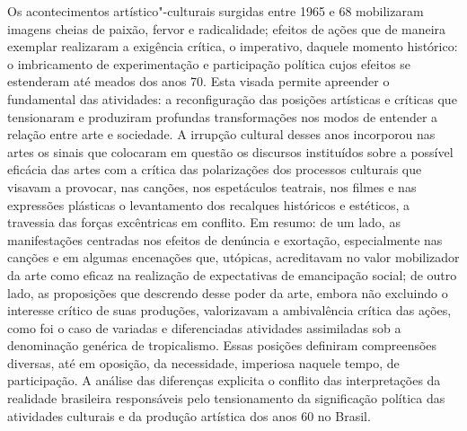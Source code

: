 Os acontecimentos artístico"-culturais surgidas entre 1965 e 68
mobilizaram imagens cheias de paixão, fervor e radicalidade; efeitos de
ações que de maneira exemplar realizaram a exigência crítica, o
imperativo, daquele momento histórico: o imbricamento de experimentação
e participação política cujos efeitos se estenderam até meados dos anos
70. Esta visada permite apreender o fundamental das atividades: a
reconfiguração das posições artísticas e críticas que tensionaram e
produziram profundas transformações nos modos de entender a relação
entre arte e sociedade. A irrupção cultural desses anos incorporou nas
artes os sinais que colocaram em questão os discursos instituídos sobre
a possível eficácia das artes com a crítica das polarizações dos
processos culturais que visavam a provocar, nas canções, nos espetáculos
teatrais, nos filmes e nas expressões plásticas o levantamento dos
recalques históricos e estéticos, a travessia das forças excêntricas em
conflito. Em resumo: de um lado, as manifestações centradas nos efeitos
de denúncia e exortação, especialmente nas canções e em algumas
encenações que, utópicas, acreditavam no valor mobilizador da arte como
eficaz na realização de expectativas de emancipação social; de outro
lado, as proposições que descrendo desse poder da arte, embora não
excluindo o interesse crítico de suas produções, valorizavam a
ambivalência crítica das ações, como foi o caso de variadas e
diferenciadas atividades assimiladas sob a denominação genérica de
tropicalismo. Essas posições definiram compreensões diversas, até em
oposição, da necessidade, imperiosa naquele tempo, de participação. A
análise das diferenças explicita o conflito das interpretações da
realidade brasileira responsáveis pelo tensionamento da significação
política das atividades culturais e da produção artística dos anos 60 no
Brasil.

